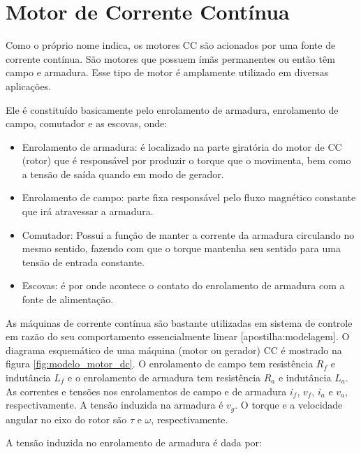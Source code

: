 \section{Motor de Corrente Contínua}
\label{sec:motor_ref_teo}
Como o próprio nome indica, os motores CC são acionados por uma fonte de corrente contínua. São motores que possuem ímãs permanentes ou então têm campo e armadura. Esse tipo de motor é amplamente utilizado em diversas aplicações.

Ele é constituído basicamente pelo enrolamento de armadura, enrolamento de campo, comutador e as escovas, onde:

\begin{itemize}
    \item Enrolamento de armadura: é localizado na parte giratória do motor de CC (rotor) que é responsável por produzir o torque que o movimenta, bem como a tensão de saída quando em modo de gerador.
    
    \item Enrolamento de campo: parte fixa responsável pelo fluxo magnético constante que irá atravessar a armadura. 
    
    \item Comutador: Possui a função de manter a corrente da armadura circulando no mesmo sentido, fazendo com que o torque mantenha seu sentido para uma tensão de entrada constante.
    
    \item Escovas: é por onde acontece o contato do enrolamento de armadura com a fonte de alimentação.
\end{itemize}


As máquinas de corrente contínua são bastante utilizadas em sistema de controle em razão do seu comportamento essencialmente linear [apostilha:modelagem]. O diagrama esquemático de uma máquina (motor ou gerador) CC é mostrado na figura \ref{fig:modelo_motor_dc}. O enrolamento de campo tem resistência $R_f$ e indutância $L_f$ e o enrolamento de armadura tem resistência $R_a$ e indutância $L_a$. As correntes e tensões nos enrolamentos de campo e de armadura $i_f$, $v_f$, $i_a$ e $v_a$, respectivamente. A tensão induzida na armadura é $v_g$. O torque e a velocidade angular no eixo do rotor são $\tau$ e $\omega$, respectivamente.

A tensão induzida no enrolamento de armadura é dada por:

